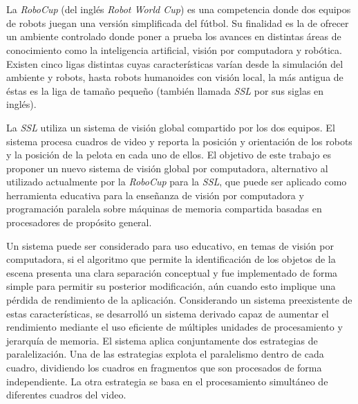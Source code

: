 \ \\
\ \\
\label{pagresum}
\\
\ \\
\ \\

\ \\

\ \\

La \emph{RoboCup} (del inglés \emph{Robot World Cup}) es una competencia donde
dos equipos de robots juegan una versión simplificada del fútbol. Su finalidad
es la de ofrecer un ambiente controlado donde poner a prueba los avances en
distintas áreas de conocimiento como la inteligencia artificial, visión por
computadora y robótica. Existen cinco ligas distintas cuyas características
varían desde la simulación del ambiente y robots, hasta robots humanoides con
visión local, la más antigua de éstas es la liga de tamaño pequeño (también
llamada \emph{SSL} por sus siglas en inglés).

La \emph{SSL} utiliza un sistema de visión global compartido por los dos
equipos. El sistema procesa cuadros de video y reporta la posición y orientación
de los robots y la posición de la pelota en cada uno de ellos. El objetivo de
este trabajo es proponer un nuevo sistema de visión global por computadora,
alternativo al utilizado actualmente por la \emph{RoboCup} para la \emph{SSL},
que puede ser aplicado como herramienta educativa para la enseñanza de visión
por computadora y programación paralela sobre máquinas de memoria compartida
basadas en procesadores de propósito general.

Un sistema puede ser considerado para uso educativo, en temas de visión por
computadora, si el algoritmo que permite la identificación de los objetos de la
escena presenta una clara separación conceptual y fue implementado de forma
simple para permitir su posterior modificación, aún cuando esto implique una
pérdida de rendimiento de la aplicación. Considerando un sistema preexistente
de estas características, se desarrolló un sistema derivado capaz de aumentar el
rendimiento mediante el uso eficiente de múltiples unidades de procesamiento y
jerarquía de memoria. El sistema aplica conjuntamente dos estrategias de
paralelización. Una de las estrategias explota el paralelismo dentro de cada
cuadro, dividiendo los cuadros en fragmentos que son procesados de forma
independiente. La otra estrategia se basa en el procesamiento simultáneo de
diferentes cuadros del video.

